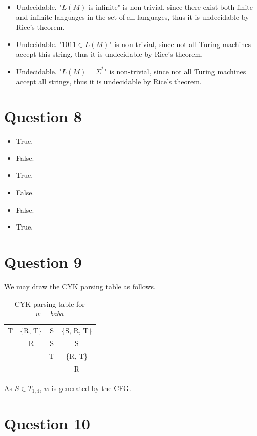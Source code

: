 \documentclass[a4paper, UTF-8]{article}
\theoremstyle{plain}
\begin{document}
\begin{itemize}
  \item Undecidable. "$L(M)$ is infinite" is non-trivial, since there exist both finite and infinite languages in the set of all languages, thus it is undecidable by Rice's theorem. 
  \item Undecidable. "$1011 \in L(M)$" is non-trivial, since not all Turing machines accept this string, thus it is undecidable by Rice's theorem.
  \item Undecidable. "$L(M) = \Sigma^*$" is non-trivial, since not all Turing machines accept all strings, thus it is undecidable by Rice's theorem.
\end{itemize} 

\section{Question 8} 

\begin{itemize}
  \item True. 
  \item False. 
  \item True. 
  \item False. 
  \item False. 
  \item True. 
\end{itemize}

\section{Question 9}

We may draw the CYK parsing table as follows.

\begin{table} 
\centering
\caption{CYK parsing table for $w = baba$}
\begin{tabular}{c|c|c|c}
\hline
T & \{R, T\}& S  & \{S, R, T\}\\ 
  & R & S& S \\ 
  &   & T & \{R, T\}\\ 
  &   &   & R \\
\hline
\end{tabular}
\end{table}

As $S \in T_{1,4}$, $w$ is generated by the CFG.

\section{Question 10} 
\end{document}
